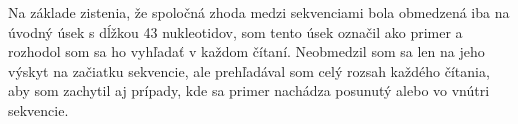 
Na základe zistenia, že spoločná zhoda medzi sekvenciami bola obmedzená iba
na úvodný úsek s dĺžkou 43 nukleotidov, som tento úsek označil ako primer
a rozhodol som sa ho vyhľadať v každom čítaní. Neobmedzil som sa len na jeho
výskyt na začiatku sekvencie, ale prehľadával som celý rozsah každého čítania,
aby som zachytil aj prípady, kde sa primer nachádza posunutý alebo vo vnútri
sekvencie.